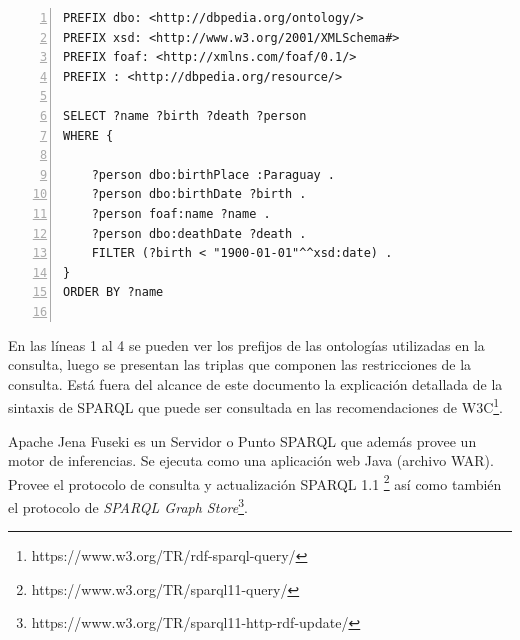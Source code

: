 \lstset{
    language=MySPARQL
}

\noindent\begin{minipage}{\textwidth}
\begin{lstlisting}[captionpos=b, caption=Ejemplo de consulta SPARQL, label=lst:consulta-sparql,  numbers=left,  numberstyle=\tiny\color{mygray},frame=single]
PREFIX dbo: <http://dbpedia.org/ontology/>
PREFIX xsd: <http://www.w3.org/2001/XMLSchema#>
PREFIX foaf: <http://xmlns.com/foaf/0.1/>
PREFIX : <http://dbpedia.org/resource/>

SELECT ?name ?birth ?death ?person 
WHERE { 

    ?person dbo:birthPlace :Paraguay . 
    ?person dbo:birthDate ?birth . 
    ?person foaf:name ?name . 
    ?person dbo:deathDate ?death . 
    FILTER (?birth < "1900-01-01"^^xsd:date) . 
}
ORDER BY ?name
 
\end{lstlisting}
\end{minipage}

En las líneas 1 al 4 se pueden ver los prefijos de las ontologías utilizadas en la consulta, luego se presentan las triplas que componen las restricciones de la consulta. Está fuera del alcance de este documento la explicación detallada de la sintaxis de SPARQL que puede ser consultada en las recomendaciones de W3C\footnote{https://www.w3.org/TR/rdf-sparql-query/}.

Apache Jena Fuseki es un Servidor o Punto SPARQL que además provee un motor de inferencias. Se ejecuta como una aplicación web Java (archivo WAR). Provee el protocolo de consulta y actualización SPARQL 1.1 \footnote{https://www.w3.org/TR/sparql11-query/} así como también el protocolo de \textit{SPARQL Graph Store}\footnote{https://www.w3.org/TR/sparql11-http-rdf-update/}.
